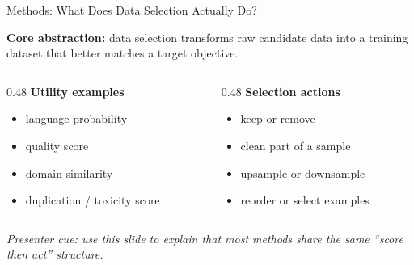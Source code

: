 \documentclass[aspectratio=169]{beamer}
\begin{document}
\begin{frame}{Methods: What Does Data Selection Actually Do?}

\textbf{Core abstraction:} data selection transforms raw candidate data into a training dataset that better matches a target objective.

\vspace{0.8em}

\begin{center}
\end{center}

\vspace{0.7em}

\begin{columns}[T]
\begin{column}{0.48\textwidth}
\textbf{Utility examples}
\begin{itemize}
  \item language probability
  \item quality score
  \item domain similarity
  \item duplication / toxicity score
\end{itemize}
\end{column}
\begin{column}{0.48\textwidth}
\textbf{Selection actions}
\begin{itemize}
  \item keep or remove
  \item clean part of a sample
  \item upsample or downsample
  \item reorder or select examples
\end{itemize}
\end{column}
\end{columns}

\vspace{0.3em}
\footnotesize\textit{Presenter cue: use this slide to explain that most methods share the same ``score then act'' structure.}

\end{frame}
\end{document}
